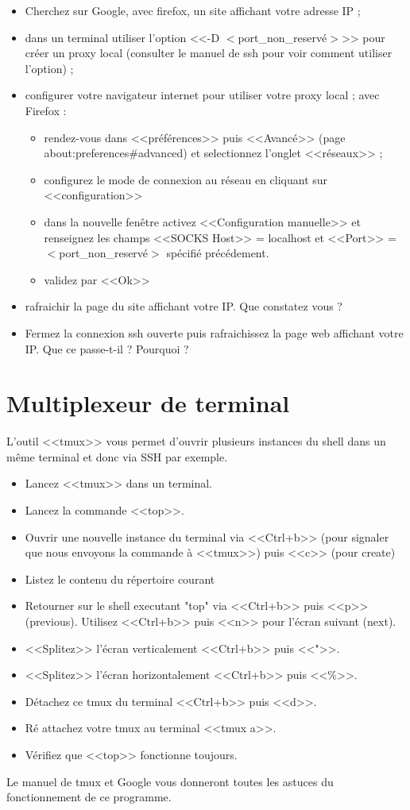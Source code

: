 \documentclass[11pt]{article}
\begin{document}
\begin{itemize}
 \item Cherchez sur Google, avec firefox, un site affichant votre adresse IP ;
 \item dans un terminal utiliser l'option <<-D $<$port\_non\_reservé$>$>> pour créer un proxy local (consulter le manuel de ssh pour voir comment utiliser l'option) ;
 \item configurer votre navigateur internet pour utiliser votre proxy local ; avec Firefox :
 \begin{itemize}
  \item rendez-vous dans <<préférences>> puis <<Avancé>> (page about:preferences\#advanced) et selectionnez l'onglet <<réseaux>> ;
  \item configurez le mode de connexion au réseau en cliquant sur <<configuration>>
  \item dans la nouvelle fenêtre activez <<Configuration manuelle>> et renseignez les champs <<SOCKS Host>> = localhost et <<Port>> = $<$port\_non\_reservé$>$ spécifié précédement.
  \item validez par <<Ok>>
 \end{itemize}
 \item rafraichir la page du site affichant votre IP. Que constatez vous ?
 \item Fermez la connexion ssh ouverte puis rafraichissez la page web affichant votre IP. Que ce passe-t-il ? Pourquoi ?
\end{itemize}

\section{Multiplexeur de terminal}

L'outil <<tmux>> vous permet d'ouvrir plusieurs instances du shell dans un même terminal et donc via SSH par exemple.

\begin{itemize}
 \item Lancez <<tmux>> dans un terminal. 
 \item Lancez la commande <<top>>.
 \item Ouvrir une nouvelle instance du terminal via <<Ctrl+b>> (pour signaler que nous envoyons la commande à <<tmux>>) puis <<c>> (pour create)
 \item Listez le contenu du répertoire courant
 \item Retourner sur le shell executant "top" via <<Ctrl+b>> puis <<p>> (previous). Utilisez <<Ctrl+b>> puis <<n>> pour l'écran suivant (next).
 \item <<Splitez>> l'écran verticalement <<Ctrl+b>> puis <<">>.
 \item <<Splitez>> l'écran horizontalement <<Ctrl+b>> puis <<\%>>.
 \item Détachez ce tmux du terminal <<Ctrl+b>> puis <<d>>.
 \item Ré attachez votre tmux au terminal <<tmux a>>.
 \item Vérifiez que <<top>> fonctionne toujours.
\end{itemize}

Le manuel de tmux et Google vous donneront toutes les astuces du fonctionnement de ce programme.
\end{document}
